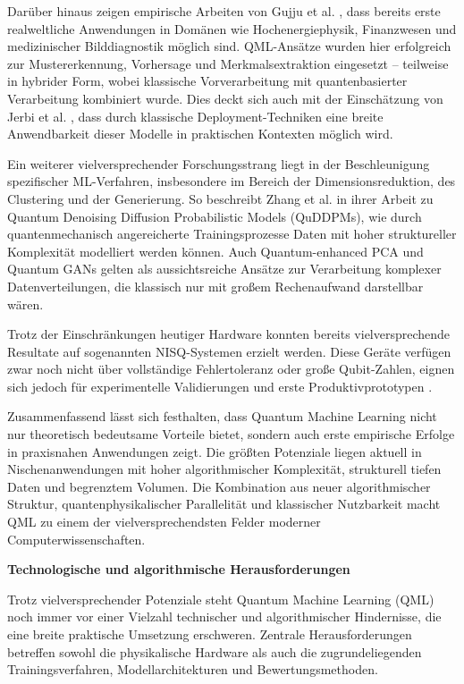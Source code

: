 Darüber hinaus zeigen empirische Arbeiten von Gujju et al. \cite{gujju2024}, dass bereits erste realweltliche Anwendungen in Domänen wie Hochenergiephysik, Finanzwesen und medizinischer Bilddiagnostik möglich sind. QML-Ansätze wurden hier erfolgreich zur Mustererkennung, Vorhersage und Merkmalsextraktion eingesetzt – teilweise in hybrider Form, wobei klassische Vorverarbeitung mit quantenbasierter Verarbeitung kombiniert wurde. Dies deckt sich auch mit der Einschätzung von Jerbi et al. \cite[1]{jerbi2024}, dass durch klassische Deployment-Techniken eine breite Anwendbarkeit dieser Modelle in praktischen Kontexten möglich wird.

Ein weiterer vielversprechender Forschungsstrang liegt in der Beschleunigung spezifischer ML-Verfahren, insbesondere im Bereich der Dimensionsreduktion, des Clustering und der Generierung. So beschreibt Zhang et al. \cite{zhang2024} in ihrer Arbeit zu Quantum Denoising Diffusion Probabilistic Models (QuDDPMs), wie durch quantenmechanisch angereicherte Trainingsprozesse Daten mit hoher struktureller Komplexität modelliert werden können. Auch Quantum-enhanced PCA und Quantum GANs gelten als aussichtsreiche Ansätze zur Verarbeitung komplexer Datenverteilungen, die klassisch nur mit großem Rechenaufwand darstellbar wären.

Trotz der Einschränkungen heutiger Hardware konnten bereits vielversprechende Resultate auf sogenannten NISQ-Systemen erzielt werden. Diese Geräte verfügen zwar noch nicht über vollständige Fehlertoleranz oder große Qubit-Zahlen, eignen sich jedoch für experimentelle Validierungen und erste Produktivprototypen \cite{peralGarcia2024, gujju2024}.

Zusammenfassend lässt sich festhalten, dass Quantum Machine Learning nicht nur theoretisch bedeutsame Vorteile bietet, sondern auch erste empirische Erfolge in praxisnahen Anwendungen zeigt. Die größten Potenziale liegen aktuell in Nischenanwendungen mit hoher algorithmischer Komplexität, strukturell tiefen Daten und begrenztem Volumen. Die Kombination aus neuer algorithmischer Struktur, quantenphysikalischer Parallelität und klassischer Nutzbarkeit macht QML zu einem der vielversprechendsten Felder moderner Computerwissenschaften.


\vspace{1em}
\noindent\textbf{Technologische und algorithmische Herausforderungen}

\noindent
Trotz vielversprechender Potenziale steht Quantum Machine Learning (QML) noch immer vor einer Vielzahl technischer und algorithmischer Hindernisse, die eine breite praktische Umsetzung erschweren. Zentrale Herausforderungen betreffen sowohl die physikalische Hardware als auch die zugrundeliegenden Trainingsverfahren, Modellarchitekturen und Bewertungsmethoden.

